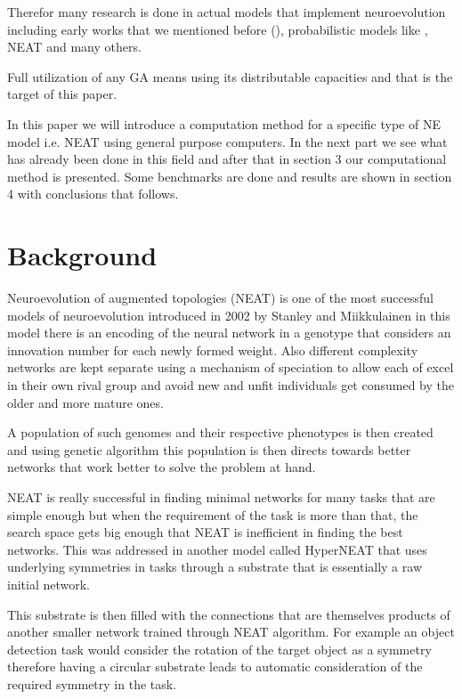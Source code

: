 \documentclass[twocolumn]{article}
\begin{document}
Therefor many research is done in actual models that
implement neuroevolution including early works
that we mentioned before 
(\cite{NEDefenitionMiikkulainen}), probabilistic 
models like \cite{OtherNESample1}, NEAT
\cite{originalNEAT} and many others.

Full utilization of any GA means using its distributable
capacities and that is the target of this paper.

In this paper we will introduce a computation method
for a specific type of NE model i.e. NEAT using general
purpose computers. In the next part we see what has 
already been done in this field and after that in 
section 3 our computational method is presented. Some 
benchmarks are done and results are shown in section 
4 with conclusions that follows.


\section{Background}
Neuroevolution of augmented topologies (NEAT) is one
of the most successful models of neuroevolution
introduced in 2002 by Stanley and Miikkulainen
\cite{originalNEAT} in this model there is an encoding
of the neural network in a genotype that considers
an innovation number for each newly formed weight.
Also different complexity networks are kept separate
using a mechanism of speciation to allow each of
excel in their own rival group and avoid new and
unfit individuals get consumed by the older and more
mature ones.

A population of such genomes and their respective 
phenotypes is then created and using genetic algorithm
this population is then directs towards better networks
that work better to solve the problem at hand.

NEAT is really successful in finding minimal networks
for many tasks that are simple enough but when the
requirement of the task is more than that, the search 
space gets big enough that NEAT is inefficient in
finding the best networks. This was addressed in 
another model called HyperNEAT \cite{originalHyperNEAT}
that uses underlying symmetries in tasks through
a substrate that is essentially a raw initial network.

This substrate is then filled with the connections
that are themselves products of another smaller network
trained through NEAT algorithm. For example
an object detection task would consider the rotation
of the target object as a symmetry therefore having a
circular substrate leads to automatic consideration
of the required symmetry in the task.
\end{document}
